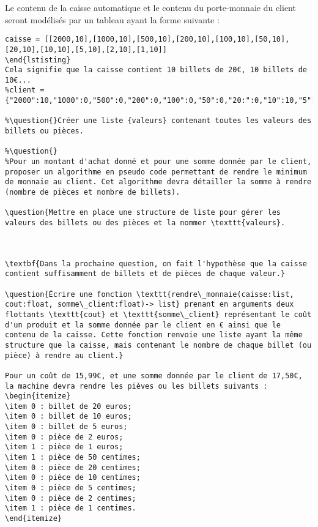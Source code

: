 Le contenu de la caisse automatique et le contenu du porte-monnaie du client seront modélisés par un tableau ayant la forme suivante : 
\begin{lstlisting}
caisse = [[2000,10],[1000,10],[500,10],[200,10],[100,10],[50,10],[20,10],[10,10],[5,10],[2,10],[1,10]]
\end{lstisting}
Cela signifie que la caisse contient 10 billets de 20€, 10 billets de 10€... 
%client = {"2000":10,"1000":0,"500":0,"200":0,"100":0,"50":0,"20:":0,"10":10,"5":10,"2":0,"1":0}

%\question{}Créer une liste {valeurs} contenant toutes les valeurs des billets ou pièces.

%\question{}
%Pour un montant d'achat donné et pour une somme donnée par le client, proposer un algorithme en pseudo code permettant de rendre le minimum de monnaie au client. Cet algorithme devra détailler la somme à rendre (nombre de pièces et nombre de billets).

\question{Mettre en place une structure de liste pour gérer les valeurs des billets ou des pièces et la nommer \texttt{valeurs}.



\textbf{Dans la prochaine question, on fait l'hypothèse que la caisse contient suffisamment de billets et de pièces de chaque valeur.}

\question{Écrire une fonction \texttt{rendre\_monnaie(caisse:list, cout:float, somme\_client:float)-> list} prenant en arguments deux flottants \texttt{cout} et \texttt{somme\_client} représentant le coût d'un produit et la somme donnée par le client en € ainsi que le contenu de la caisse. Cette fonction renvoie une liste ayant la même structure que la caisse, mais contenant le nombre de chaque billet (ou pièce) à rendre au client.}

Pour un coût de 15,99€, et une somme donnée par le client de 17,50€, la machine devra rendre les pièves ou les billets suivants : 
\begin{itemize}
\item 0 : billet de 20 euros;
\item 0 : billet de 10 euros;
\item 0 : billet de 5 euros;
\item 0 : pièce de 2 euros;
\item 1 : pièce de 1 euros;
\item 1 : pièce de 50 centimes;
\item 0 : pièce de 20 centimes;
\item 0 : pièce de 10 centimes;
\item 0 : pièce de 5 centimes;
\item 0 : pièce de 2 centimes;
\item 1 : pièce de 1 centimes.
\end{itemize}


\end{lstlisting}

